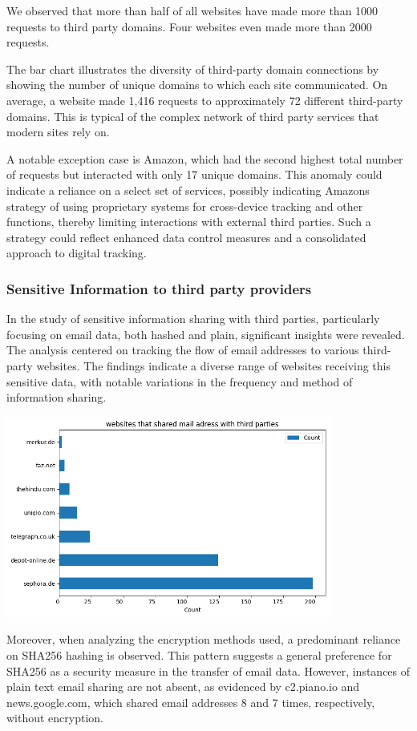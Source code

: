 We observed that more than half of all websites have made more than 1000 requests to third party domains. Four websites even made more than 2000 requests. 

The bar chart illustrates the diversity of third-party domain connections by showing the number of unique domains to which each site communicated. On average, a website made 1,416 requests to approximately 72 different third-party domains. This is typical of the complex network of third party services that modern sites rely on.

A notable exception case is Amazon, which had the second highest total number of requests but interacted with only 17 unique domains. This anomaly could indicate a reliance on a select set of services, possibly indicating Amazons strategy of using proprietary systems for cross-device tracking and other functions, thereby limiting interactions with external third parties. Such a strategy could reflect enhanced data control measures and a consolidated approach to digital tracking.

\subsubsection{Sensitive Information to third party providers}
In the study of sensitive information sharing with third parties, particularly focusing on email data, both hashed and plain, significant insights were revealed. The analysis centered on tracking the flow of email addresses to various third-party websites. The findings indicate a diverse range of websites receiving this sensitive data, with notable variations in the frequency and method of information sharing.

\includegraphics[width=0.8\textwidth]{./assets/websitesSharingMailAddresses.png}

Moreover, when analyzing the encryption methods used, a predominant reliance on SHA256 hashing is observed. This pattern suggests a general preference for SHA256 as a security measure in the transfer of email data. However, instances of plain text email sharing are not absent, as evidenced by c2.piano.io and news.google.com, which shared email addresses 8 and 7 times, respectively, without encryption.

